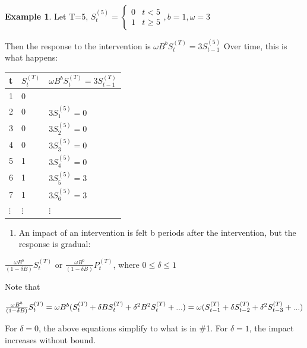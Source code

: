 \documentclass[
]{book}
\providecommand{\tightlist}{%
  \setlength{\itemsep}{0pt}\setlength{\parskip}{0pt}}
\theoremstyle{definition}
\theoremstyle{definition}
\newtheorem{example}{Example}[chapter]
\theoremstyle{definition}
\theoremstyle{definition}
\theoremstyle{remark}
\begin{document}
\begin{example}

Let T=5, \(S^{(5)}_t=\begin{cases}0 & t<5 \\ 1 & t\ge 5\end{cases}, b=1, \omega=3\)

Then the response to the intervention is \(\omega B^bS_t^{(T)}=3S^{(5)}_{t-1}\) Over time, this is what happens:

\begin{longtable}[]{@{}lll@{}}
\toprule()
t & \(S_t^{(T)}\) & \(\omega B^bS_t^{(T)}=3S^{(T)}_{t-1}\) \\
\midrule()
\endhead
1 & 0 & \\
2 & 0 & \(3S^{(5)}_{1}=0\) \\
3 & 0 & \(3S^{(5)}_{2}=0\) \\
4 & 0 & \(3S^{(5)}_{3}=0\) \\
5 & 1 & \(3S^{(5)}_{4}=0\) \\
6 & 1 & \(3S^{(5)}_{5}=3\) \\
7 & 1 & \(3S^{(5)}_{6}=3\) \\
\(\vdots\) & \(\vdots\) & \(\vdots\) \\
\bottomrule()
\end{longtable}

\end{example}

\begin{enumerate}
\def\labelenumi{\arabic{enumi}.}
\setcounter{enumi}{1}
\tightlist
\item
  An impact of an intervention is felt b periods after the intervention, but the response is gradual:
\end{enumerate}

\(\frac{\omega B^b}{(1-\delta B)}S^{(T)}_t\) or \(\frac{\omega B^b}{(1-\delta B)}P^{(T)}_t\), where \(0\le \delta \le 1\)

Note that

\(\frac{\omega B^b}{(1-\delta B)}S^{(T)}_t=\omega B^b(S^{(T)}_t+\delta BS_t^{(T)}+\delta^2B^2S^{(T)}_t+...)\\=\omega(S^{(T)}_{t-1}+\delta S^{(T)}_{t-2}+\delta^2S^{(T)}_{t-3}+...)\)

For \(\delta = 0\), the above equations simplify to what is in \#1. For \(\delta = 1\), the impact increases without bound.
\end{document}
